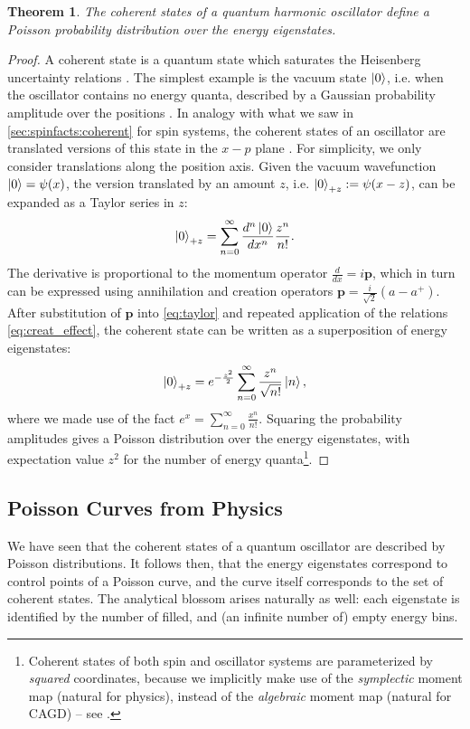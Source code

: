 \documentclass[12pt,final,3p]{elsarticle}
\newtheorem{theorem}{Theorem}
\begin{document}
\begin{theorem}
	The coherent states of a quantum harmonic oscillator define a Poisson probability distribution over the energy eigenstates.
\end{theorem}
\begin{proof}
	A coherent state is a quantum state which saturates the Heisenberg uncertainty relations \cite{gazeau2009coherent}. The simplest example is the vacuum state $\ket{0}$, i.e. when the oscillator contains no energy quanta, described by a Gaussian probability amplitude over the positions \cite{townsend2000modern}. In analogy with what we saw in \autoref{sec:spinfacts:coherent} for spin systems, the coherent states of an oscillator are translated versions of this state in the $x-p$ plane \cite{gazeau2009coherent}. For simplicity, we only consider translations along the position axis. Given the vacuum wavefunction $\ket{0} = \psi(x)$, the version translated by an amount $z$, i.e. $\ket{0}_{+z} := \psi(x-z)$, can be expanded as a Taylor series in $z$:
	\begin{align}\label{eq:taylor}
	\ket{0}_{+z} = \sum_{n = 0}^{\infty}\frac{d^{n}\ket{0}}{dx^{n}}\frac{z^{n}}{n!}.
	\end{align}   
	The derivative is proportional to the momentum operator $\frac{d}{dx} = i\mathbf{p}$, which in turn can be expressed using annihilation and creation operators $\mathbf{p} = \frac{i}{\sqrt{2}}(a - a^{+})$. After substitution of $\mathbf{p}$ into \eqref{eq:taylor} and repeated application of the relations \eqref{eq:creat_effect}, the coherent state can be written as a superposition of energy eigenstates:
	\begin{align}
	\ket{0}_{+z} = e^{-\frac{z^{2}}{2}}\sum_{n = 0}^{\infty}\frac{z^{n}}{\sqrt{n!}}\ket{n},
	\end{align}
	where we made use of the fact $e^{x} = \sum_{n=0}^{\infty}\frac{x^{n}}{n!}$. 
	Squaring the probability amplitudes gives a Poisson distribution over the energy eigenstates, with expectation value $z^{2}$ for the number of energy quanta\footnote{Coherent states of both spin and oscillator systems are parameterized by \emph{squared} coordinates, because we implicitly make use of the \emph{symplectic} moment map (natural for physics), instead of the \emph{algebraic} moment map (natural for CAGD) -- see  \cite{sottile2003toric}.}. 
\end{proof}

\subsection{Poisson Curves from Physics}
We have seen that the coherent states of a quantum oscillator are described by Poisson distributions. It follows then, that the energy eigenstates correspond to control points of a Poisson curve, and the curve itself corresponds to the set of coherent states. The analytical blossom arises naturally as well: each eigenstate is identified by the number of filled, and (an infinite number of) empty energy bins. 
\end{document}
